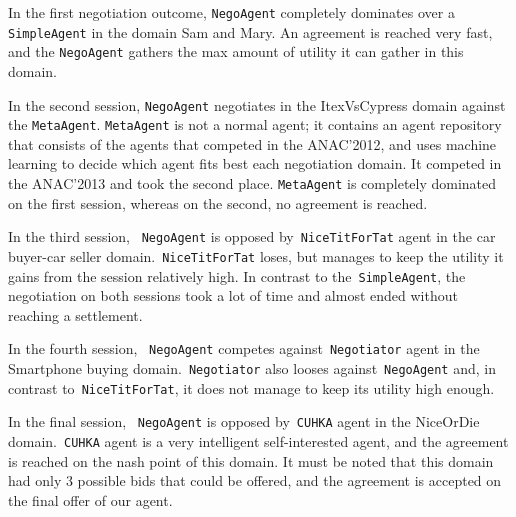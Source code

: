 \documentclass[html]{report}    %
\begin{document}
In the first negotiation outcome, \texttt{NegoAgent} completely dominates over a \texttt{SimpleAgent}  in the domain Sam and Mary. An agreement is reached very fast, and the \texttt{NegoAgent} gathers the max amount of utility it can gather in this domain. 

In the second session, \texttt{NegoAgent} negotiates in the ItexVsCypress domain against the \texttt{MetaAgent}. \texttt{MetaAgent} is not a normal agent; it contains an agent repository that consists of the agents that competed in the ANAC'2012, and uses machine learning to decide which agent fits best each negotiation domain. It competed in the ANAC'2013 and took the second place. \texttt{MetaAgent} is completely dominated on the first session, whereas on the second, no agreement is reached.

In the third session, ~\texttt{NegoAgent} is opposed by~\texttt{NiceTitForTat} agent in the car buyer-car seller domain.~\texttt{NiceTitForTat} loses, but manages to keep the utility it gains from the session relatively high. In contrast to the~\texttt{SimpleAgent}, the negotiation on both sessions took a lot of time and almost ended without reaching a settlement.

In the fourth session, ~\texttt{NegoAgent} competes against~\texttt{Negotiator} agent in the Smartphone buying domain.~\texttt{Negotiator} also looses against~\texttt{NegoAgent} and, in contrast to~\texttt{NiceTitForTat}, it does not manage to keep its utility high enough.

In the final session, ~\texttt{NegoAgent} is opposed by~\texttt{CUHKA} agent in the NiceOrDie domain.~\texttt{CUHKA} agent is a very intelligent self-interested agent, and the agreement is reached on the nash point of this domain. It must be noted that this domain had only 3 possible bids that could be offered, and the agreement is accepted on the final offer of our agent.
\end{document}
